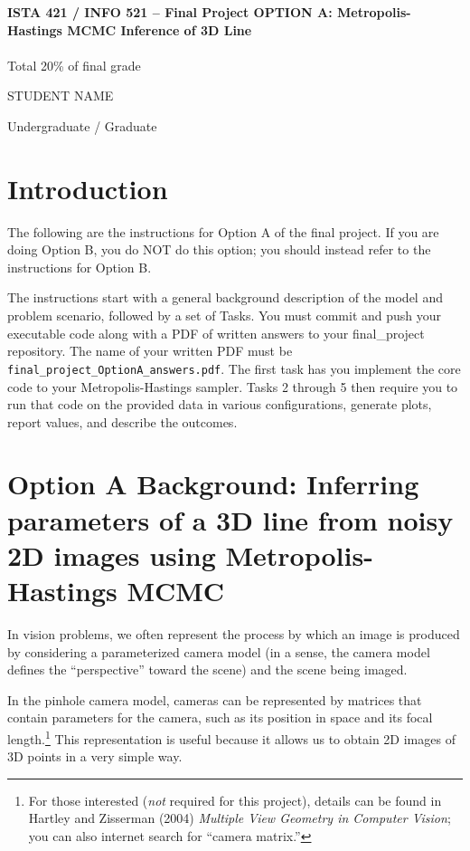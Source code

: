 \documentclass[10pt]{article}
\begin{document}
\begin{center}
    {\Large {\bf ISTA 421 / INFO 521 -- Final Project OPTION A: Metropolis-Hastings MCMC Inference of 3D Line}} \\
     \\
    Total 20\% of final grade \\
    \vspace{1cm}
\end{center}

\begin{flushright}
STUDENT NAME %

Undergraduate / Graduate %
\end{flushright}

\section*{Introduction}

The following are the instructions for Option A of the final project. If you are doing Option B, you do NOT do this option; you should instead refer to the instructions for Option B.

The instructions start with a general background description of the model and problem scenario, followed by a set of Tasks. You must commit and push your executable code along with a PDF of written answers to your final\_project repository. The name of your written PDF must be {\tt final\_project\_OptionA\_answers.pdf}. The first task has you implement the core code to your Metropolis-Hastings sampler. Tasks 2 through 5 then require you to run that code on the provided data in various configurations, generate plots, report values, and describe the outcomes.

\section*{Option A Background: Inferring parameters of a 3D line from noisy 2D images using Metropolis-Hastings MCMC}

In vision problems, we often represent the process by which an image is produced by considering a parameterized camera model (in a sense, the camera model defines the ``perspective'' toward the scene) and the scene being imaged.

In the pinhole camera model, cameras can be represented by matrices that contain parameters for the camera, such as its position in space and its focal length.\footnote{For those interested ({\em not} required for this project), details can be found in Hartley and Zisserman (2004) {\em Multiple View Geometry in Computer Vision}; you can also internet search for ``camera matrix.''}  This representation is useful because it allows us to obtain 2D images of 3D points in a very simple way.
\end{document}
